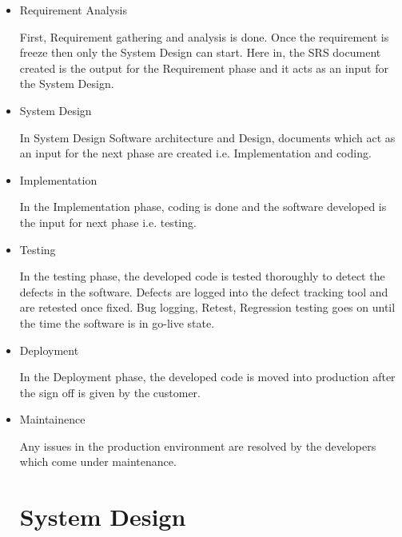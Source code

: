 \documentclass[oneside,a4paper,12pt]{book}
\begin{document}
\begin{itemize}
    \item Requirement Analysis
    \par First, Requirement gathering and analysis is done. Once the requirement is freeze then only the System Design can start. Here in, the SRS document created is the output for the Requirement phase and it acts as an input for the System Design.
    
    \item System Design
    \par In System Design Software architecture and Design, documents which act as an input for the next phase are created i.e. Implementation and coding.
    \item Implementation 
    \par In the Implementation phase, coding is done and the software developed is the input for next phase i.e. testing.
    
    \item Testing
    \par In the testing phase, the developed code is tested thoroughly to detect the defects in the software. Defects are logged into the defect tracking tool and are retested once fixed. Bug logging, Retest, Regression testing goes on until the time the software is in go-live state.
    
    \item Deployment
    \par In the Deployment phase, the developed code is moved into production after the sign off is given by the customer.
    
    \item Maintainence
    \par Any issues in the production environment are resolved by the developers which come under maintenance.
\chapter{System Design}
\end{itemize}
\end{document}
